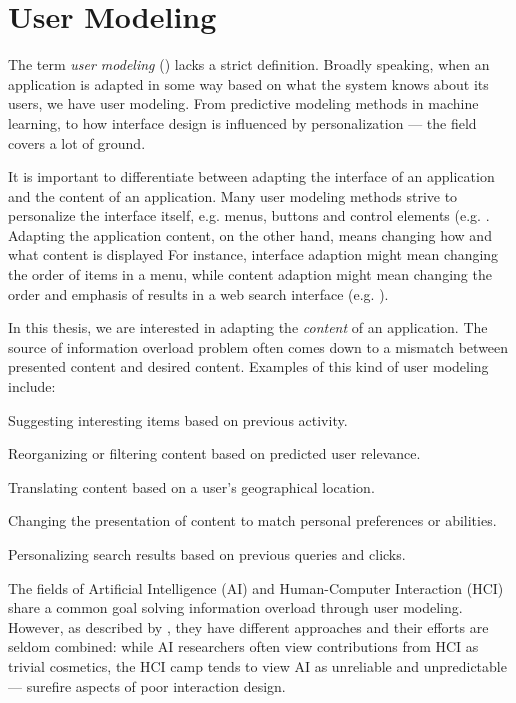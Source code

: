 \section{User Modeling}
\label{sec:modeling}

The term \emph{user modeling} () lacks a strict definition. 
Broadly speaking, when an application is adapted in some way based on what the system knows about its users, we have user modeling. 
From predictive modeling methods in machine learning, 
to how interface design is influenced by personalization --- the field covers a lot of ground. 

It is important to differentiate between adapting the interface of an application and the content of an application. 
Many user modeling methods strive to personalize the interface itself, e.g. menus, buttons and control elements 
(e.g. \cite{Jameson2009, Fischer2001}. 
Adapting the application content, on the other hand, means changing how and what content is displayed
For instance, interface adaption might mean changing the order of items in a menu, while content 
adaption might mean changing the order and emphasis of results in a web search interface
(e.g. \cite{Xu2008, Qiu2006, Rhodes2000}).

In this thesis, we are interested in adapting the \emph{content} of an application.
The source of information overload problem often comes down to a mismatch between presented content and desired content. 
Examples of this kind of user modeling include:

\begin{itemize*}
  \item Suggesting interesting items based on previous activity.
  \item Reorganizing or filtering content based on predicted user relevance.
  \item Translating content based on a user's geographical location.
  \item Changing the presentation of content to match personal preferences or abilities.
  \item Personalizing search results based on previous queries and clicks.
\end{itemize*}

The fields of Artificial Intelligence (AI) and Human-Computer Interaction (HCI) share a common goal solving information overload through user modeling. 
However, as described by \cite[p6]{Lieberman2009}, they have different approaches and their efforts are seldom combined: 
while AI researchers often view contributions from HCI as trivial cosmetics, the HCI camp
tends to view AI as unreliable and unpredictable --- surefire aspects of poor interaction design.

